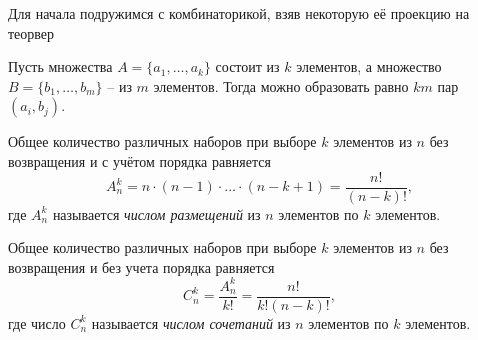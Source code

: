 Для начала подружимся с комбинаторикой, взяв некоторую её проекцию на теорвер

\begin{to_thr}[]
    Пусть множества $A = \{a_1, \ldots, a_k\}$ состоит из $k$ элементов, а множество $B = \{b_1, \ldots, b_m\}$ -- из $m$ элементов. Тогда можно образовать равно $km$ пар $(a_i, b_j)$.
\end{to_thr}

\begin{to_thr}[]
    Общее количество различных наборов при выборе $k$ элементов из $n$ без возвращения и с учётом порядка равняется
    \begin{equation*}
        A_n^k = n \cdot (n-1) \cdot \ldots \cdot (n-k+1) = \frac{n!}{(n-k)!},
    \end{equation*}
    где $A_n^k$ называется \textit{числом размещений} из $n$ элементов по $k$ элементов. 
\end{to_thr}

\begin{to_thr}[]
    Общее количество различных наборов при выборе $k$ элементов из $n$ без возвращения и без учета порядка равняется
    \begin{equation*}
        C_n^k = \frac{A_n^k}{k!} = \frac{n!}{k! (n-k)!},
    \end{equation*}
    где число $C_n^k$ называется \textit{числом сочетаний} из $n$ элементов по $k$ элементов. 
\end{to_thr}

